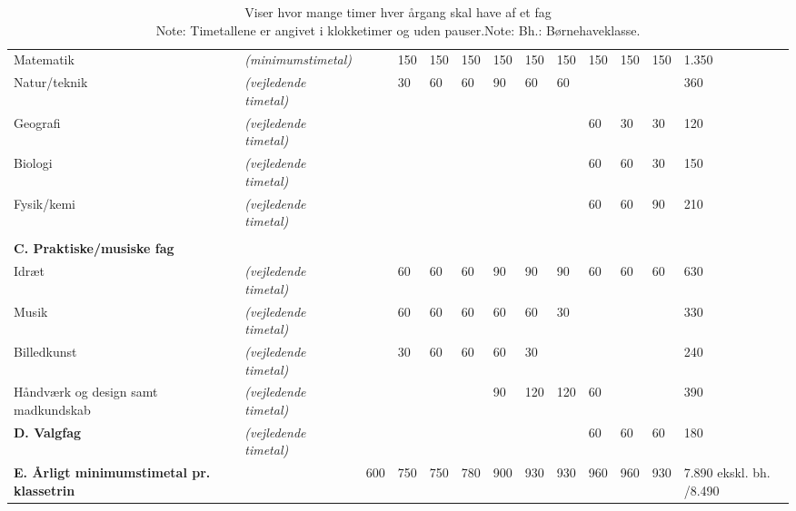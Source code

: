\begin{landscape}
\begin{table}[h!]
{\begin{tabular}{lllllllllllll}
			Matematik                                                  & \textit{(minimumstimetal)}    &     & 150 & 150 & 150 & 150 & 150 & 150 & 150 & 150 & 150 & 1.350                   \\
			Natur/teknik                                               & \textit{(vejledende timetal)} &     & 30  & 60  & 60  & 90  & 60  & 60  &     &     &     & 360                     \\
			Geografi                                                   & \textit{(vejledende timetal)} &     &     &     &     &     &     &     & 60  & 30  & 30  & 120                     \\
			Biologi                                                    & \textit{(vejledende timetal)} &     &     &     &     &     &     &     & 60  & 60  & 30  & 150                     \\
			Fysik/kemi                                                 & \textit{(vejledende timetal)} &     &     &     &     &     &     &     & 60  & 60  & 90  & 210                     \\
			&                               &     &     &     &     &     &     &     &     &     &     &                         \\
			\textbf{C. Praktiske/musiske fag}                          &                               &     &     &     &     &     &     &     &     &     &     &                         \\
			Idræt                                                      & \textit{(vejledende timetal)} &     & 60  & 60  & 60  & 90  & 90  & 90  & 60  & 60  & 60  & 630                     \\
			Musik                                                      & \textit{(vejledende timetal)} &     & 60  & 60  & 60  & 60  & 60  & 30  &     &     &     & 330                     \\
			Billedkunst                                                & \textit{(vejledende timetal)} &     & 30  & 60  & 60  & 60  & 30  &     &     &     &     & 240                     \\
			Håndværk og design samt madkundskab                        & \textit{(vejledende timetal)} &     &     &     &     & 90  & 120 & 120 & 60  &     &     & 390                     \\
			\textbf{D. Valgfag}                                        & \textit{(vejledende timetal)} &     &     &     &     &     &     &     & 60  & 60  & 60  & 180                     \\
			\textbf{E. Årligt minimumstimetal pr. klassetrin}          &                               & 600 & 750 & 750 & 780 & 900 & 930 & 930 & 960 & 960 & 930 & 7.890 ekskl. bh. /8.490
		\end{tabular}
	}
	\caption{Viser hvor mange timer hver årgang skal have af et fag\cite{Lovgivning}\\Note: Timetallene er angivet i klokketimer og uden pauser.Note: Bh.: Børnehaveklasse.}
	\label{TimetalsKrav}
\end{table}

\end{landscape}